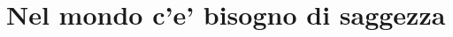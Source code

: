 \documentclass[11pt,twoside,draft]{memoir}
\begin{document}
\chapter{Nel mondo c'e' bisogno di saggezza}



%
%
%
%


% 
% 
% 
% 
% 
% 
% 
% 

\cleartorecto
\thispagestyle{plain}


\emptysheet
\end{document}
